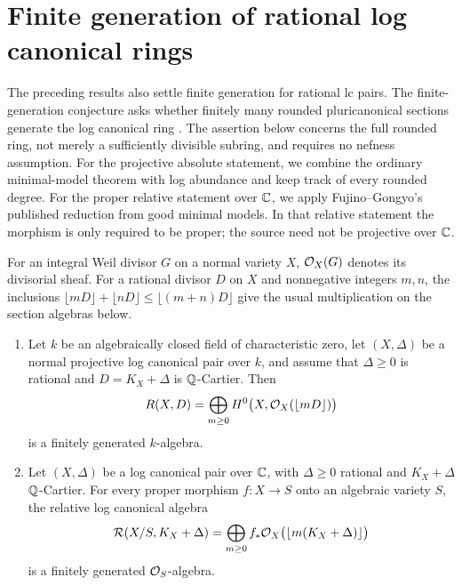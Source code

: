 \section{Finite generation of rational log canonical rings}
\label{sec:canonical-rings}

The preceding results also settle finite generation for rational lc pairs.
The finite-generation conjecture asks whether finitely many rounded
pluricanonical sections generate the log canonical ring
\cite[Conjecture~A]{FujinoGongyoRings2014}. The assertion below concerns
the full rounded ring, not merely a sufficiently divisible subring, and
requires no nefness assumption.
For the projective absolute statement, we combine the ordinary minimal-model
theorem with log abundance and keep track of every rounded degree. For the
proper relative statement over \(\mathbb{C}\), we apply Fujino--Gongyo's published
reduction from good minimal models.
In that relative statement the morphism is only required to be proper;
the source need not be projective over \(\mathbb{C}\).

For an integral Weil divisor \(G\) on a normal variety \(X\),
\(\mathcal{O}_X(G)\) denotes its divisorial sheaf. For a rational divisor \(D\)
on \(X\) and nonnegative integers \(m,n\), the inclusions
\(\lfloor mD\rfloor+\lfloor nD\rfloor\leq\lfloor(m+n)D\rfloor\)
give the usual multiplication on the section algebras below.

\begin{samepage}
\begin{corollary}
\label{cor:lc-finite-generation}
\leavevmode
\begin{enumerate}[label=\textup{(\roman*)}]
\item Let \(k\) be an algebraically closed field of characteristic zero,
let \((X,\Delta)\) be a normal projective log canonical pair over \(k\), and assume
that \(\Delta\geq0\) is rational and \(D=K_X+\Delta\) is \(\mathbb{Q}\)-Cartier.
Then
\[
 R(X,D)=\bigoplus_{m\geq0}
 H^0\bigl(X,\mathcal{O}_X(\lfloor mD\rfloor)\bigr)
\]
is a finitely generated \(k\)-algebra.

\item Let \((X,\Delta)\) be a log canonical pair over \(\mathbb{C}\), with
\(\Delta\geq0\) rational and \(K_X+\Delta\) \(\mathbb{Q}\)-Cartier. For every
proper morphism \(f:X\to S\) onto an algebraic variety \(S\), the relative
log canonical algebra
\[
 \mathcal R(X/S,K_X+\Delta)
 =\bigoplus_{m\geq0}f_*\mathcal{O}_X\bigl(\lfloor m(K_X+\Delta)\rfloor\bigr)
\]
is a finitely generated \(\mathcal{O}_S\)-algebra.
\end{enumerate}
\end{corollary}
\end{samepage}

